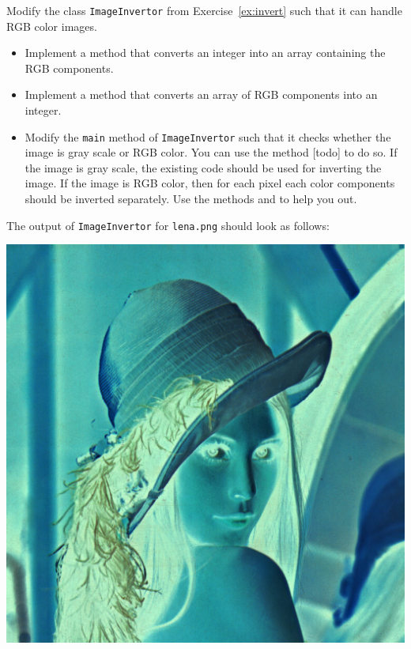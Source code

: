 \documentclass{book}
\begin{document}
\begin{exercise}
Modify the class \texttt{ImageInvertor} from Exercise~\ref{ex:invert} such that it can handle RGB color images.
\begin{itemize}
  \item Implement a method  that converts an integer into an array containing the RGB components.
  \item Implement a method  that converts an array of RGB components into an integer.
  \item Modify the \texttt{main} method of \texttt{ImageInvertor}  such that it checks whether the image is gray scale or RGB color. You can use the method [todo]\texttt{} to do so. If the image is gray scale, the existing code should be used for inverting the image. If the image is RGB color, then for each pixel each  color components should be inverted separately. Use the methods  and  to help you out.
\end{itemize}
The output of \texttt{ImageInvertor} for \texttt{lena.png} should look as follows:
\begin{center}
\includegraphics[scale=0.2]{lena-inverted.png}
\end{center}
\end{exercise}
\end{document}
